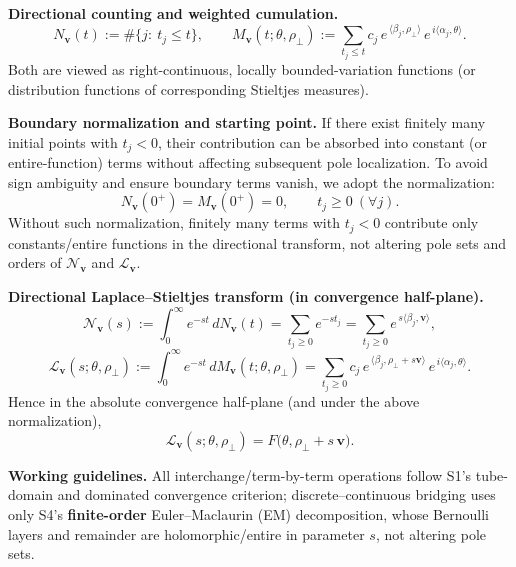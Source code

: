 \documentclass[11pt,a4paper]{article}
\theoremstyle{remark}
\begin{document}
\textbf{Directional counting and weighted cumulation.}
\begin{equation}
N_{\mathbf{v}}(t):=\#\{j:\ t_j\le t\},\qquad
M_{\mathbf{v}}(t;\theta,\rho_\perp):=\sum_{t_j\le t} c_j\,e^{\,\langle\beta_j,\rho_\perp\rangle}\,e^{\,i\langle\alpha_j,\theta\rangle}.
\end{equation}
Both are viewed as right-continuous, locally bounded-variation functions (or distribution functions of corresponding Stieltjes measures).

\textbf{Boundary normalization and starting point.} If there exist finitely many initial points with $t_j<0$, their contribution can be absorbed into constant (or entire-function) terms without affecting subsequent pole localization. To avoid sign ambiguity and ensure boundary terms vanish, we adopt the normalization:
\begin{equation}
N_{\mathbf{v}}(0^+)=M_{\mathbf{v}}(0^+)=0,\qquad t_j\ge0\ (\forall j) .
\end{equation}
Without such normalization, finitely many terms with $t_j<0$ contribute only constants/entire functions in the directional transform, not altering pole sets and orders of $\mathscr{N}_{\mathbf{v}}$ and $\mathcal{L}_{\mathbf{v}}$.

\textbf{Directional Laplace--Stieltjes transform (in convergence half-plane).}
\begin{equation}
\mathscr{N}_{\mathbf{v}}(s):=\int_{0}^{\infty} e^{-s t}\,dN_{\mathbf{v}}(t)
=\sum_{t_j\ge0}e^{-s t_j}
=\sum_{t_j\ge0} e^{\,s\langle\beta_j,\mathbf{v}\rangle},
\end{equation}
\begin{equation}
\mathcal{L}_{\mathbf{v}}(s;\theta,\rho_\perp):=\int_{0}^{\infty} e^{-s t}\,dM_{\mathbf{v}}(t;\theta,\rho_\perp)
=\sum_{t_j\ge0} c_j\,e^{\,\langle\beta_j,\rho_\perp+s\mathbf{v}\rangle}\,e^{\,i\langle\alpha_j,\theta\rangle}.
\end{equation}
Hence in the absolute convergence half-plane (and under the above normalization),
\begin{equation}
\mathcal{L}_{\mathbf{v}}(s;\theta,\rho_\perp)=F\big(\theta,\rho_\perp+s\,\mathbf{v}\big).
\end{equation}

\textbf{Working guidelines.} All interchange/term-by-term operations follow S1's tube-domain and dominated convergence criterion; discrete--continuous bridging uses only S4's \textbf{finite-order} Euler--Maclaurin (EM) decomposition, whose Bernoulli layers and remainder are holomorphic/entire in parameter $s$, not altering pole sets.
\end{document}
